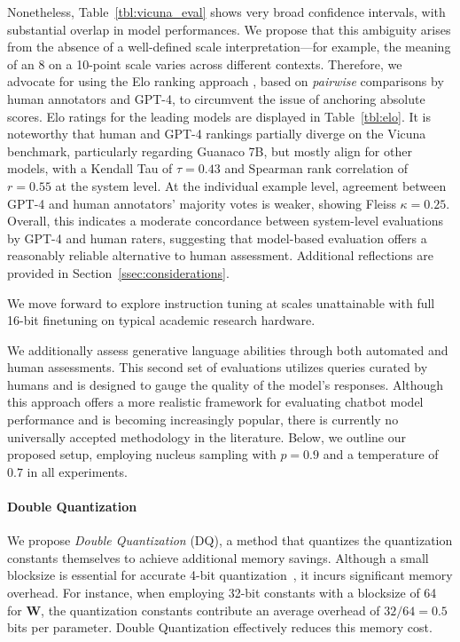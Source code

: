 Nonetheless, Table~\ref{tbl:vicuna_eval} shows very broad confidence intervals, with substantial overlap in model performances. We propose that this ambiguity arises from the absence of a well-defined scale interpretation—for example, the meaning of an 8 on a 10-point scale varies across different contexts. Therefore, we advocate for using the Elo ranking approach \citep{elo1967proposed}, based on \textit{pairwise} comparisons by human annotators and GPT-4, to circumvent the issue of anchoring absolute scores. Elo ratings for the leading models are displayed in Table~\ref{tbl:elo}. It is noteworthy that human and GPT-4 rankings partially diverge on the Vicuna benchmark, particularly regarding Guanaco 7B, but mostly align for other models, with a Kendall Tau of $\tau=0.43$ and Spearman rank correlation of $r=0.55$ at the system level. At the individual example level, agreement between GPT-4 and human annotators' majority votes is weaker, showing Fleiss $\kappa=0.25$. Overall, this indicates a moderate concordance between system-level evaluations by GPT-4 and human raters, suggesting that model-based evaluation offers a reasonably reliable alternative to human assessment. Additional reflections are provided in Section~\ref{ssec:considerations}.

We move forward to explore instruction tuning at scales unattainable with full 16-bit finetuning on typical academic research hardware.

We additionally assess generative language abilities through both automated and human assessments. This second set of evaluations utilizes queries curated by humans and is designed to gauge the quality of the model's responses. Although this approach offers a more realistic framework for evaluating chatbot model performance and is becoming increasingly popular, there is currently no universally accepted methodology in the literature. Below, we outline our proposed setup, employing nucleus sampling with $p=0.9$ and a temperature of $0.7$ in all experiments.

\paragraph{Double Quantization{}}
We propose \emph{Double Quantization} (DQ), a method that quantizes the quantization constants themselves to achieve additional memory savings. Although a small blocksize is essential for accurate 4-bit quantization~\citep{dettmers2022case}, it incurs significant memory overhead. For instance, when employing 32-bit constants with a blocksize of 64 for $\mathbf{W}$, the quantization constants contribute an average overhead of $32/64 = 0.5$ bits per parameter. Double Quantization effectively reduces this memory cost.

